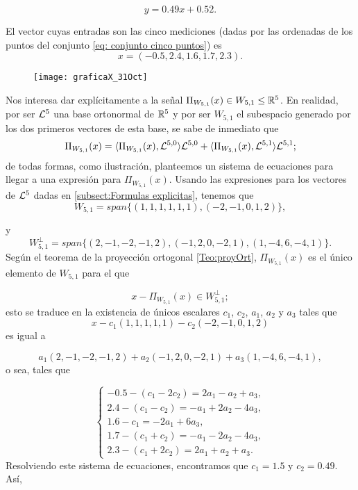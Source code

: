 {\begin{equation} \label{eq: recta minimos cuadrados}
y=0.49x+0.52.
\end{equation}

El vector cuyas entradas
son las cinco mediciones (dadas por las ordenadas
de los puntos del conjunto \eqref{eq: conjunto cinco puntos})
es
\begin{equation}
\label{eq0: 29Nov}
x=(-0.5, 2.4, 1.6, 1.7, 2.3).
\end{equation}


\begin{figure}[H]
	\centering
	\texttt{[image: graficaX\_31Oct]} 
\end{figure}	


Nos interesa
dar explícitamente a 
la señal $\Pi_{W_{5,1}}(x) \in W_{5,1} \leq \mathbb{R}^{5}$.
En realidad, por ser $\mathcal{L}^{5}$ 
una base ortonormal de $\mathbb{R}^{5}$ y por ser
$W_{5,1}$ el subespacio generado por los
dos primeros vectores de esta base, 
se sabe de inmediato que
\[
\Pi_{W_{5,1}}(x)=  \langle \Pi_{W_{5,1}}(x), \mathcal{L}^{5,0} \rangle \mathcal{L}^{5,0}
+ \langle \Pi_{W_{5,1}}(x), \mathcal{L}^{5,1} \rangle \mathcal{L}^{5,1};
\]
de todas formas, como ilustración, planteemos un sistema
de ecuaciones para llegar a una expresión para
$\Pi_{W_{5,1}}(x)$.
Usando las expresiones para los vectores
de $\mathcal{L}^{5}$
dadas en \ref{subsect:Formulas explicitas},
tenemos que
\[
W_{5,1}=span\{ (1,1,1,1,1,1), (-2, -1, 0, 1, 2) \},
\]

y 
\[
W_{5,1}^{\perp}=span\{ (2,-1,-2,-1,2), (-1,2,0,-2,1), (1,-4,6,-4,1)\}.
\]
Según el teorema de la proyección ortogonal \ref{Teo:proyOrt},
$\Pi_{W_{5,1}}(x)$ es el único elemento de $W_{5,1}$ para el 
que 

\[
x-\Pi_{W_{5,1}}(x) \in W_{5,1}^{\perp};
\]
esto se 
traduce en la existencia de 
únicos escalares $c_{1}$, $c_{2}$,
$a_{1}$, $a_{2}$ y $a_{3}$ tales que
\[
x-c_{1}(1,1,1,1,1)-c_{2}(-2, -1, 0, 1, 2)
\]
es igual a 

\[
a_{1}(2,-1,-2,-1,2)+a_{2}(-1,2,0,-2,1)
+ a_{3}(1,-4,6,-4,1),
\]
\noindent
o sea, tales que

\begin{equation*}
\begin{cases}
-0.5-(c_{1}-2c_{2})=2a_{1}-a_{2}+a_{3}, \\
2.4-(c_{1}-c_{2})=-a_{1}+2a_{2}-4a_{3}, \\
1.6-c_{1}=-2a_{1}+6a_{3},\\
1.7-(c_{1}+c_{2})=-a_{1}-2a_{2}-4a_{3}, \\
2.3-(c_{1}+2c_{2})=2a_{1}+a_{2}+a_{3}.
\end{cases}
\end{equation*}
Resolviendo este sistema
de ecuaciones, encontramos que
$c_{1}=1.5$ y $c_{2}=0.49$. Así,




}
